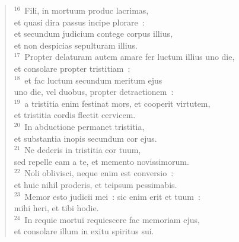\begin{flushleft}\begin{verse}${}^{16}$~Fili, in mortuum produc lacrimas,\\ et quasi dira passus incipe plorare~:\\ et secundum judicium contege corpus illius,\\ et non despicias sepulturam illius.\\
${}^{17}$~Propter delaturam autem amare fer luctum illius uno die,\\ et consolare propter tristitiam~:\\
${}^{18}$~et fac luctum secundum meritum ejus\\ uno die, vel duobus, propter detractionem~:\\
${}^{19}$~a tristitia enim festinat mors, et cooperit virtutem,\\ et tristitia cordis flectit cervicem.\\
${}^{20}$~In abductione permanet tristitia,\\ et substantia inopis secundum cor ejus.\\
${}^{21}$~Ne dederis in tristitia cor tuum,\\ sed repelle eam a te, et memento novissimorum.\\
${}^{22}$~Noli oblivisci, neque enim est conversio~:\\ et huic nihil proderis, et teipsum pessimabis.\\
${}^{23}$~Memor esto judicii mei~: sic enim erit et tuum~:\\ mihi heri, et tibi hodie.\\
${}^{24}$~In requie mortui requiescere fac memoriam ejus,\\ et consolare illum in exitu spiritus sui.\end{verse}\end{flushleft}


